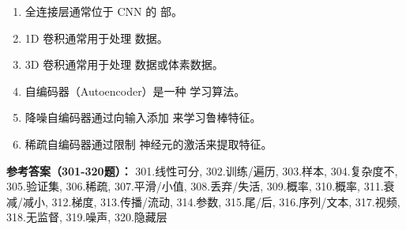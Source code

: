 \begin{enumerate}[resume,leftmargin=2em,itemsep=1pt]
\item 全连接层通常位于 CNN 的 \underline{\hspace{3em}} 部。
\item 1D 卷积通常用于处理 \underline{\hspace{3em}} 数据。
\item 3D 卷积通常用于处理 \underline{\hspace{3em}} 数据或体素数据。
\item 自编码器（Autoencoder）是一种 \underline{\hspace{3em}} 学习算法。
\item 降噪自编码器通过向输入添加 \underline{\hspace{3em}} 来学习鲁棒特征。
\item 稀疏自编码器通过限制 \underline{\hspace{3em}} 神经元的激活来提取特征。
\end{enumerate}

\textbf{参考答案（301-320题）：}
301.线性可分, 302.训练/遍历, 303.样本, 304.复杂度不, 305.验证集, 306.稀疏, 307.平滑/小值, 308.丢弃/失活, 309.概率, 310.概率, 311.衰减/减小, 312.梯度, 313.传播/流动, 314.参数, 315.尾/后, 316.序列/文本, 317.视频, 318.无监督, 319.噪声, 320.隐藏层

